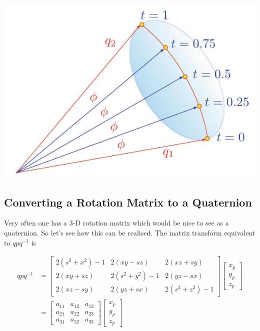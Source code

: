 \documentclass[10pt]{article}
\begin{document}
\begin{center}
\includegraphics[max width=\textwidth]{2023_04_20_41f1ceac5a31dc7d1b59g-173}
\end{center}

\subsection{Converting a Rotation Matrix to a Quaternion}
Very often one has a 3-D rotation matrix which would be nice to see as a quaternion. So let's see how this can be realised. The matrix transform equivalent to $q p q^{-1}$ is

$$
\begin{aligned}
q p q^{-1} & =\left[\begin{array}{ccc}
2\left(s^{2}+x^{2}\right)-1 & 2(x y-s z) & 2(x z+s y) \\
2(x y+s z) & 2\left(s^{2}+y^{2}\right)-1 & 2(y z-s x) \\
2(x z-s y) & 2(y z+s x) & 2\left(s^{2}+z^{2}\right)-1
\end{array}\right]\left[\begin{array}{l}
x_{p} \\
y_{p} \\
z_{p}
\end{array}\right] \\
& =\left[\begin{array}{lll}
a_{11} & a_{12} & a_{13} \\
a_{21} & a_{22} & a_{23} \\
a_{31} & a_{32} & a_{33}
\end{array}\right]\left[\begin{array}{l}
x_{p} \\
y_{p} \\
z_{p}
\end{array}\right]
\end{aligned}
$$
\end{document}
